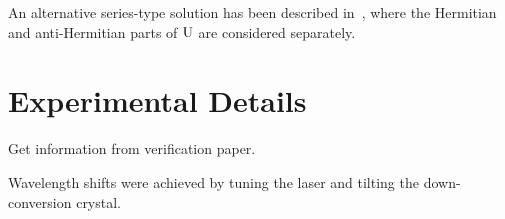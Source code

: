An alternative series-type solution has been described in~\cite{hamiltomo},
where the Hermitian and anti-Hermitian parts of \(\mathrm{U}\) are considered
separately.

\section{Experimental Details}
\label{sec:HamiltomoExperiment}
Get information from verification paper.

Wavelength shifts were achieved by tuning the laser and tilting the
down-conversion crystal.



